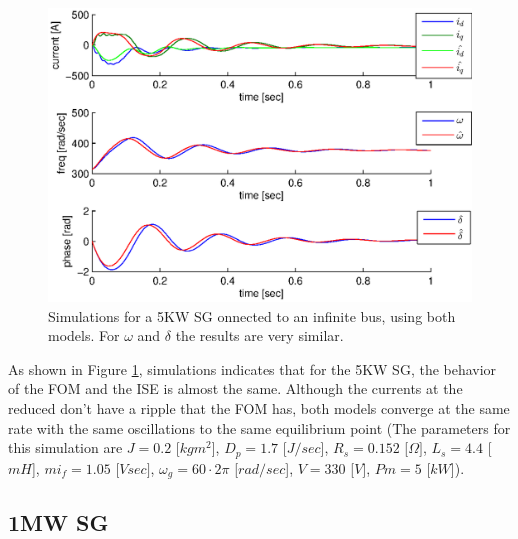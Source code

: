 \documentclass[conference]{IEEEtran}
\renewcommand{\o}    {{\omega}}
\begin{document}
\begin{figure}[ht]
\includegraphics[scale=0.6]{sim5KWInfBus}

\caption{Simulations for a 5KW SG onnected to an infinite bus,
using both models. For $\o$ and $\delta$ the results are very 
similar.} \label{fig:InfBusOne5KWSG}
\end{figure}


As shown in Figure \ref{fig:InfBusOne5KWSG}, simulations indicates
that for the 5KW SG, the behavior of the FOM and the ISE is almost the
same. Although the currents at the reduced don't have a ripple that
the FOM has, both models converge at the same rate with the same
oscillations to the same equilibrium point (The parameters for this
simulation are $J=0.2$ {[}$kgm^{2}${]}, $D_{p}=1.7$ {[}$J/sec${]},
$R_{s}=0.152$ {[}$\Omega]$, $L_{s}=4.4$ {[}$mH${]}, $mi_{f}=1.05$
{[}$Vsec]$, $\omega_{g}=60\cdotp2\pi$ {[}$rad/sec${]}, $V=330$
{[}$V]$, $Pm=5$ {[}$kW${]}).

\subsection{1MW SG}
\end{document}

